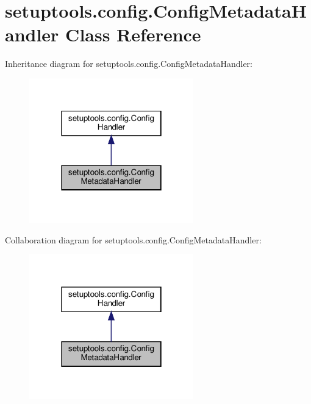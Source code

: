 \hypertarget{classsetuptools_1_1config_1_1ConfigMetadataHandler}{}\section{setuptools.\+config.\+Config\+Metadata\+Handler Class Reference}
\label{classsetuptools_1_1config_1_1ConfigMetadataHandler}


Inheritance diagram for setuptools.\+config.\+Config\+Metadata\+Handler\+:
\nopagebreak
\begin{figure}[H]
\begin{center}
\leavevmode
\includegraphics[width=202pt]{classsetuptools_1_1config_1_1ConfigMetadataHandler__inherit__graph}
\end{center}
\end{figure}


Collaboration diagram for setuptools.\+config.\+Config\+Metadata\+Handler\+:
\nopagebreak
\begin{figure}[H]
\begin{center}
\leavevmode
\includegraphics[width=202pt]{classsetuptools_1_1config_1_1ConfigMetadataHandler__coll__graph}
\end{center}
\end{figure}
